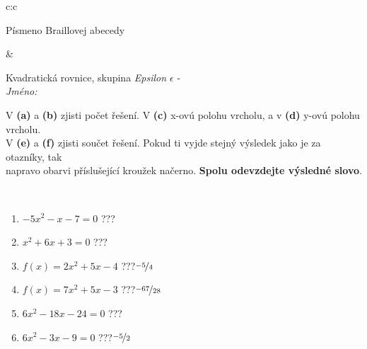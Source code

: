 \documentclass[10pt]{report}
\begin{document}
\begin{tabular}{c:c}
\begin{minipage}[c][104.5mm][t]{0.5\linewidth}
\begin{center}
\begin{minipage}{0.20\linewidth}
\begin{center}
{\small Písmeno Braillovej abecedy}
\end{center}
\end{minipage}
\end{center}
\end{minipage}
&
\begin{minipage}[c][104.5mm][t]{0.5\linewidth}
\begin{center}
\vspace{7mm}
{\huge Kvadratická rovnice, skupina \textit{Epsilon $\epsilon$} -}\\[5mm]
\textit{Jméno:}\phantom{xxxxxxxxxxxxxxxxxxxxxxxxxxxxxxxxxxxxxxxxxxxxxxxxxxxxxxxxxxxxxxxxx}\\[5mm]
\begin{minipage}{0.95\linewidth}
\begin{center}
V \textbf{(a)} a \textbf{(b)} zjisti počet řešení. V \textbf{(c)} x-ovú polohu vrcholu, a v \textbf{(d)} y-ovú polohu vrcholu.\\V \textbf{(e)} a \textbf{(f)} zjisti součet řešení. Pokud ti vyjde stejný výsledek jako je za otazníky, tak\\napravo obarvi příslušející kroužek načerno. \textbf{Spolu odevzdejte výsledné slovo}.
\end{center}
\end{minipage}
\\[1mm]
\begin{minipage}{0.79\linewidth}
\begin{center}
\begin{varwidth}{\linewidth}
\begin{enumerate}
\Large
\item $-5x^2-x-7=0$\quad \dotfill\; ???\;\dotfill {}
\item $x^2+6x+3=0$\quad \dotfill\; ???\;\dotfill {}
\item $f(x)=2x^2+5x-4$\quad \dotfill\; ???\;\dotfill \quad $\nicefrac{-5}{4}$
\item $f(x)=7x^2+5x-3$\quad \dotfill\; ???\;\dotfill \quad $\nicefrac{-67}{28}$
\item $6x^2-18x-24=0$\quad \dotfill\; ???\;\dotfill {}
\item $6x^2-3x-9=0$\quad \dotfill\; ???\;\dotfill \quad $\nicefrac{-5}{2}$
\end{enumerate}
\end{varwidth}
\end{center}
\end{minipage}
\begin{minipage}{0.20\linewidth}

\end{minipage}
\end{center}
\end{minipage}
\end{tabular}
\end{document}
